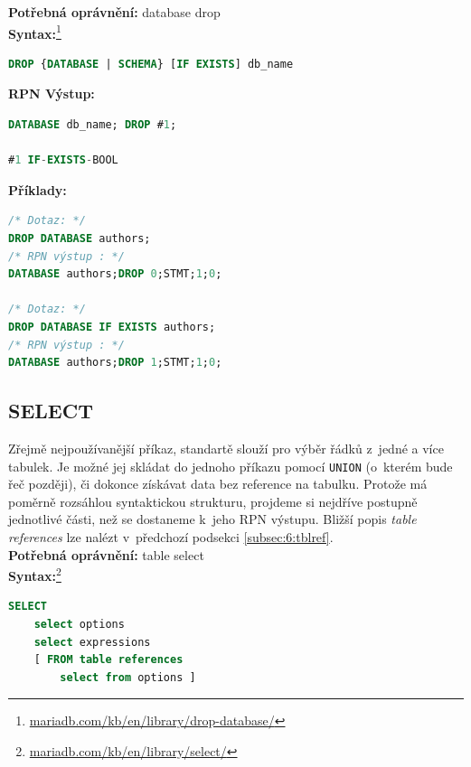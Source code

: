 \textbf{Potřebná oprávnění:} database drop \\

\textbf{Syntax:}\footnote{\url{mariadb.com/kb/en/library/drop-database/}}
\begin{lstlisting}[language=sql]
DROP {DATABASE | SCHEMA} [IF EXISTS] db_name
\end{lstlisting}
\vspace*{\baselineskip}
\textbf{RPN Výstup:}
\begin{lstlisting}[language=sql]
DATABASE db_name; DROP #1;

#1 IF-EXISTS-BOOL
\end{lstlisting}
\vspace*{\baselineskip}
\textbf{Příklady:}
\begin{lstlisting}[language=sql]
/* Dotaz: */
DROP DATABASE authors;
/* RPN výstup : */
DATABASE authors;DROP 0;STMT;1;0;

/* Dotaz: */
DROP DATABASE IF EXISTS authors;
/* RPN výstup : */
DATABASE authors;DROP 1;STMT;1;0;
\end{lstlisting}

\subsection{SELECT} \label{subsec:6:select}
Zřejmě nejpoužívanější příkaz, standartě slouží pro výběr řádků z~jedné a více tabulek. Je možné jej skládat do jednoho příkazu pomocí 
\texttt{UNION} (o~kterém bude řeč později), či dokonce získávat data bez reference na tabulku. Protože má poměrně rozsáhlou syntaktickou 
strukturu, projdeme si nejdříve postupně jednotlivé části, než se dostaneme k~jeho RPN výstupu. Bližší popis \textit{table references}
lze nalézt v~předchozí podsekci \ref{subsec:6:tblref}. \\

\textbf{Potřebná oprávnění:} table select \\
\textbf{Syntax:}\footnote{\url{mariadb.com/kb/en/library/select/}}
\begin{lstlisting}[language=sql]
SELECT
    select options
    select expressions
    [ FROM table references
        select from options ]
\end{lstlisting}

